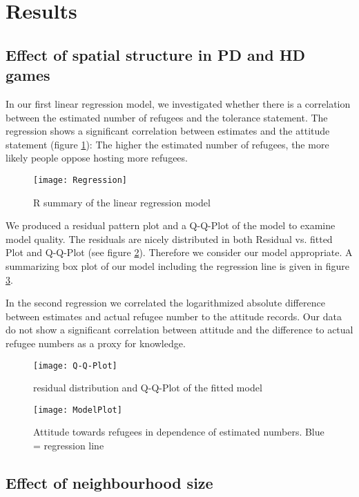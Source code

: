 \section{Results}


\subsection{Effect of spatial structure in PD and HD games}
In our first linear regression model, we investigated whether there is a correlation between the estimated number of refugees and the tolerance statement. 
The regression shows a significant correlation between estimates and the attitude statement (figure \ref{fig: Regression}): The higher the estimated number of refugees, the more likely people oppose hosting more refugees.

\begin{figure}[H]
	\centering 
	\texttt{[image: Regression]}
	\caption{R summary of the linear regression model}\label{fig: Regression}
\end{figure}

We produced a residual pattern plot and a Q-Q-Plot of the model to examine model quality. The residuals are nicely distributed in both Residual vs. fitted Plot and Q-Q-Plot (see figure \ref{fig: Q-Q-Plot}). Therefore we consider our model appropriate.
A summarizing box plot of our model including the regression line is given in figure \ref{fig: ModelPlot}.

In the second regression we correlated the logarithmized absolute difference between estimates and actual refugee number to the attitude records. Our data do not show a significant correlation between attitude and the difference to actual refugee numbers as a proxy for knowledge.



\begin{figure}[H]
	\centering 
	\texttt{[image: Q-Q-Plot]}
	\caption{residual distribution and Q-Q-Plot of the fitted model}\label{fig: Q-Q-Plot}
\end{figure}


\begin{figure}[H]
	\centering 
	\texttt{[image: ModelPlot]}
	\caption{Attitude towards refugees in dependence of estimated numbers. Blue = regression line}\label{fig: ModelPlot}
\end{figure}


\subsection{Effect of neighbourhood size}

